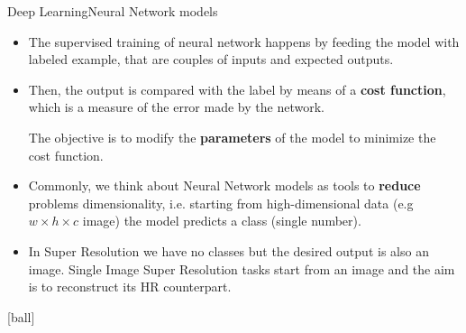 \documentclass[10pt, unicode]{beamer}
\begin{document}
\begin{frame}{Deep Learning}{Neural Network models}
  
  \begin{itemize}
    \item The supervised training of neural network happens by feeding the model 
          with labeled example, that are couples of inputs and expected outputs.
    \item Then, the output is compared with the label by means of a \textbf{cost function}, which is a measure of the error made by the network.
          
          The objective is to modify the \textbf{parameters} of the model to minimize the cost function.
    
    \item {Commonly, we think about Neural Network models as tools to \textbf{reduce} problems dimensionality, i.e. starting from high-dimensional data (e.g $w\times h\times c$ image) the model predicts a class (single number)}.

    \item {In Super Resolution we have no classes but the desired output is also an image.
          Single Image Super Resolution tasks start from an image and the aim is to reconstruct its HR counterpart.}
  \end{itemize}
  
  [ball]










\end{frame}
 
\end{document}

